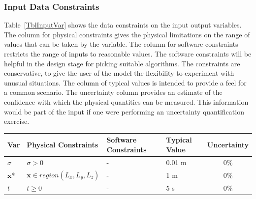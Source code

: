 \documentclass[12pt]{article}
\begin{document}



\subsubsection{Input Data Constraints} \label{sec_DataConstraints}    

Table~\ref{TblInputVar} shows the data constraints on the input output
variables.  The column for physical constraints gives the physical limitations
on the range of values that can be taken by the variable.  The column for
software constraints restricts the range of inputs to reasonable values.  The
software constraints will be helpful in the design stage for picking suitable
algorithms.  The constraints are conservative, to give the user of the model the
flexibility to experiment with unusual situations.  The column of typical values
is intended to provide a feel for a common scenario.  The uncertainty column
provides an estimate of the confidence with which the physical quantities can be
measured.  This information would be part of the input if one were performing an
uncertainty quantification exercise.


\begin{table}[!h]
  \caption{Input Variables} \label{TblInputVar}
  \renewcommand{\arraystretch}{1.2}
\noindent \begin{longtable*}{l l l l c} 
  \toprule
  \textbf{Var} & \textbf{Physical Constraints} & \textbf{Software Constraints} &
                             \textbf{Typical Value} & \textbf{Uncertainty}\\
  \midrule 
    $\sigma$ & $\sigma > 0$ & - & 0.01 \si[per-mode=symbol] {\metre} & 0\%
  \\
    $\textbf{x}$* & $\textbf{x} \in region(L_x,L_y,L_z)$ & - & 1 \si[per-mode=symbol] {\metre} & 0\%
  \\
    $t$ & $t \geq 0$ & - & 5 \si[per-mode=symbol] {\second} & 0\%
  \\
  \bottomrule
\end{longtable*}
\end{table}
\end{document}
